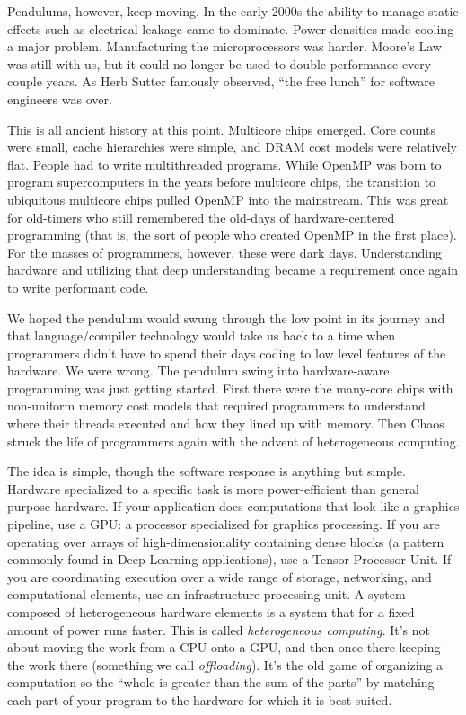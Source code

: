 Pendulums, however, keep moving.  In the early 2000s the ability to manage static effects such as electrical
leakage came to dominate.   Power densities made cooling a major problem.  Manufacturing the microprocessors was harder. Moore's Law was 
still with us, but it could no longer be used to double performance every couple years.
As Herb Sutter famously observed, ``the free lunch'' for software engineers was over. 

This is all ancient history at this point.  Multicore chips emerged.  Core counts were small, cache hierarchies were 
simple, and DRAM cost models were relatively flat.   People had to write multithreaded programs.   While OpenMP
was born to program supercomputers in the years before multicore chips,
the transition to ubiquitous multicore chips pulled OpenMP into the mainstream.  This was great for 
old-timers who still remembered the old-days of hardware-centered programming (that is, the sort of people 
who created OpenMP in the first place). For the masses of programmers, however, these were dark days.
Understanding hardware and utilizing that deep understanding became a requirement once again to write performant code.

We hoped the pendulum would swung through the low point in its journey and that language/compiler technology
would take us back to a time when programmers didn't have to spend their days coding to low level features of the
hardware.  We were wrong.  The pendulum swing into hardware-aware programming was just getting started.
First there were the many-core chips with non-uniform memory cost models that required programmers to understand
where their threads executed and how they lined up with memory.  Then Chaos struck the life of programmers again with
the advent of heterogeneous computing.

The idea is simple, though the software response is anything but simple.  Hardware specialized to a specific task is
more power-efficient than general purpose hardware.   If your application does computations that look like a graphics pipeline, 
use a GPU: a processor specialized for graphics processing.  If you are operating over arrays of high-dimensionality containing dense blocks
(a pattern commonly found in Deep Learning applications), use a Tensor Processor Unit.  If
you are coordinating execution over a wide range of storage, networking, and computational elements, use an infrastructure
processing unit. A system composed of heterogeneous hardware elements is a system that for a fixed amount of power runs faster.
This is called \emph{heterogeneous computing}.   It's not about moving the work from a CPU onto a GPU, and then once there 
keeping the work there (something we call \emph{offloading}).   It's the old game of organizing a computation 
so the ``whole is greater than the sum of the parts'' by matching each part of your program to the hardware for which it is best suited.

